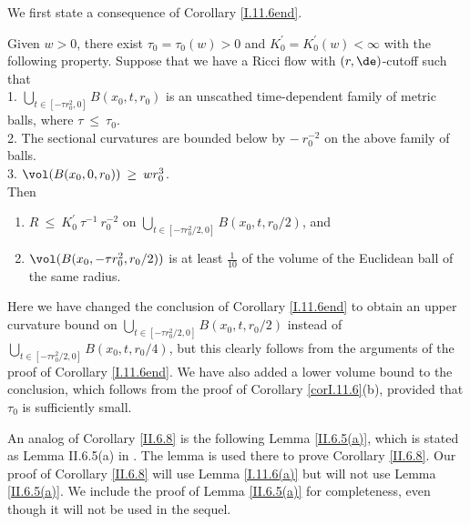 We first state a consequence of Corollary \ref{I.11.6end}.

\begin{lemma}
  \label{lem:kl-earlier-scalar-curvature-bounds-smaller-balls-from-lower-curvature-bound-estimates-scalar-curvature}
 \label{I.11.6(a)}
Given $w > 0$, there exist $\tau_0 = \tau_0(w) > 0$ and
$K_0^\prime = K_0^\prime(w) < \infty$
with the following property. Suppose that we have
a Ricci flow with $(r,\de)$-cutoff such that \\
1. $\bigcup_{t \in
[-\tau r_0^2, 0]} B(x_0, t, r_0)$ is an unscathed time-dependent family of
metric balls, where $\tau \: \le \: \tau_0$. \\
2. The sectional curvatures are bounded below by $- \: r_0^{-2}$
on the
above family of balls. \\
3. $\vol(B(x_0, 0, r_0)) \: \ge \: w r_0^3$. \\

Then
\begin{enumerate}
\item
$R \: \le \: K_0^\prime \: \tau^{-1} \: r_0^{-2}$
on $\bigcup_{ t \in [- \tau r_0^2/2, 0]} B(x_0, t, r_0/2)$, and
\item $\vol(B(x_0, -\tau r_0^2, r_0/2))$ is at least $\frac{1}{10}$
of the volume of the Euclidean ball of the same radius.
\end{enumerate}
\end{lemma}

Here we have changed the conclusion of Corollary \ref{I.11.6end} to obtain an
upper curvature bound on
$\bigcup_{ t \in [- \tau r_0^2/2, 0]} B(x_0, t, r_0/2)$
instead of $\bigcup_{ t \in [- \tau r_0^2/2, 0]} B(x_0, t, r_0/4)$,
but this clearly follows from the arguments of the proof of Corollary
\ref{I.11.6end}. We have also added a lower volume bound to the conclusion,
which follows from the proof of Corollary \ref{corI.11.6}(b), provided
that $\tau_0$ is sufficiently small.

An analog of Corollary \ref{II.6.8} is the following
Lemma \ref{II.6.5(a)}, which is stated as Lemma II.6.5(a)
in \cite{Perelman2}. The lemma is used there to prove Corollary \ref{II.6.8}.
Our proof of Corollary \ref{II.6.8} will use Lemma \ref{I.11.6(a)} but will
not use Lemma \ref{II.6.5(a)}.
We include the proof of Lemma \ref{II.6.5(a)} for completeness, even
though it will not be used in the sequel.

